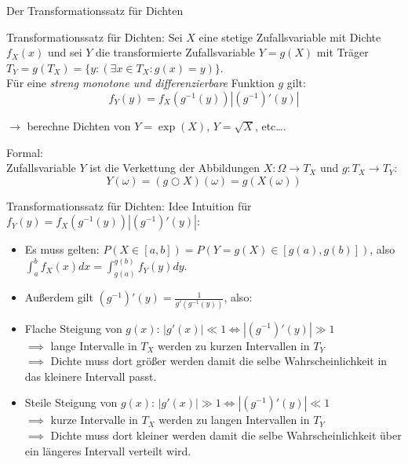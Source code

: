\documentclass[
  10pt,
  ignorenonframetext,
]{beamer}
\begin{document}
\begin{frame}{Der Transformationssatz für Dichten}
\label{der-transformationssatz-fuxfcr-dichten}
\begin{block}{Transformationssatz für Dichten:}
\label{transformationssatz-fuxfcr-dichten}
Sei \(X\) eine stetige Zufallsvariable mit Dichte \(f_X(x)\) und sei
\(Y\) die transformierte Zufallsvariable \(Y = g(X)\) mit Träger
\(T_Y = g(T_X) = \{y: (\exists x \in T_X: g(x) = y)\}.\)\\
Für eine \emph{streng monotone und differenzierbare} Funktion \(g\)
gilt: \[
f_Y(y) = f_X\left(g^{-1}(y)\right) \left|\left(g^{-1}\right)'(y)\right|
\]
\end{block}

\(\rightarrow\) berechne Dichten von \(Y = \exp(X)\), \(Y = \sqrt{X}\),
etc\ldots.

Formal:\\
Zufallsvariable \(Y\) ist die Verkettung der Abbildungen
\(X:\Omega \to T_X\) und \(g: T_X \to T_Y\):
\[Y(\omega) = (g \bigcirc X)(\omega) = g(X(\omega))\]
\end{frame}

\begin{frame}{Transformationssatz für Dichten: Idee}
\label{transformationssatz-fuxfcr-dichten-idee-1}
Intuition für
\(f_Y(y) = f_X\left(g^{-1}(y)\right) \left|\left(g^{-1}\right)'(y)\right|\):

\begin{itemize}
\item
  Es muss gelten:
  \(P\left(X \in [a, b]\right) = P\left(Y = g(X) \in \left[g(a), g(b)\right]\right)\),
  also \(\int^b_a f_X(x) dx = \int^{g(b)}_{g(a)} f_Y(y) dy\).
\item
  Außerdem gilt \(\left(g^{-1}\right)'(y) = \frac{1}{g'(g^{-1}(y))}\),
  also:
\item
  Flache Steigung von \(g(x)\):
  \(|g'(x)| \ll 1 \iff |\left(g^{-1}\right)'(y)| \gg 1\)\\
  \(\implies\) lange Intervalle in \(T_X\) werden zu kurzen Intervallen
  in \(T_Y\)\\
  \(\implies\) Dichte muss dort größer werden damit die selbe
  Wahrscheinlichkeit in das kleinere Intervall passt.
\item
  Steile Steigung von \(g(x)\):
  \(|g'(x)| \gg 1 \iff |\left(g^{-1}\right)'(y)| \ll 1\)\\
  \(\implies\) kurze Intervalle in \(T_X\) werden zu langen Intervallen
  in \(T_Y\)\\
  \(\implies\) Dichte muss dort kleiner werden damit die selbe
  Wahrscheinlichkeit über ein längeres Intervall verteilt wird.
\end{itemize}
\end{frame}
\end{document}
